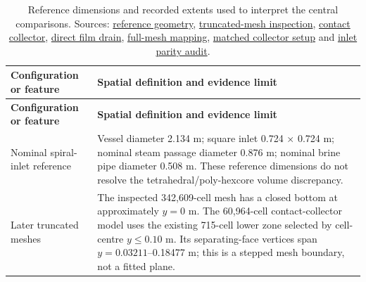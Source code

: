 \begin{longtable}{@{}>{\raggedright\arraybackslash}p{0.29000000\dimexpr\linewidth-2\tabcolsep\relax}>{\raggedright\arraybackslash}p{0.71000000\dimexpr\linewidth-2\tabcolsep\relax}@{}}
\caption{Reference dimensions and recorded extents used to interpret the central comparisons. Sources: \href{https://github.com/Shuhei-uni/P4P_knowledgeWiki/blob/main/Project/technical/purnanto-spiral-inlet-geometry.md}{reference geometry}, \href{https://github.com/Shuhei-uni/P4P_knowledgeWiki/blob/main/Project/experiments/phase-07a-simplified-purnanto-liquid-removal/mesh-inspection.md}{truncated-mesh inspection}, \href{https://github.com/Shuhei-uni/P4P_knowledgeWiki/blob/main/Project/experiments/phase-07-2a-wall-liquid-routing/stage-02-combined-ewf-roughness/ewf-absorber/setup.md}{contact collector}, \href{https://github.com/Shuhei-uni/P4P_knowledgeWiki/blob/main/Project/experiments/phase-07-2a-wall-liquid-routing/stage-04-ewf-wall-parameters/ewf-only-drain/setup.md}{direct film drain}, \href{https://github.com/Shuhei-uni/P4P_knowledgeWiki/blob/main/Project/experiments/phase-07b-full-geometry-liquid-removal/geometry-proof.md}{full-mesh mapping}, \href{https://github.com/Shuhei-uni/P4P_knowledgeWiki/blob/main/Project/experiments/phase-07b-full-geometry-liquid-removal/convergence-investigation/coupled-nphase-weaker-sink/setup.md}{matched collector setup} and \href{https://github.com/Shuhei-uni/P4P_knowledgeWiki/blob/main/Project/experiments/phase-08-storyline-reconstruction/stage-01-60k-storyline/baseline-lineage-audit.md}{inlet parity audit}.}\label{tab:table-D.2}\\
\toprule
\textbf{Configuration or feature} & \textbf{Spatial definition and evidence limit} \\
\midrule
\endfirsthead
\toprule
\textbf{Configuration or feature} & \textbf{Spatial definition and evidence limit} \\
\midrule
\endhead
Nominal spiral-inlet reference & Vessel diameter 2.134 m; square inlet 0.724 × 0.724 m; nominal steam passage diameter 0.876 m; nominal brine pipe diameter 0.508 m. These reference dimensions do not resolve the tetrahedral/poly-hexcore volume discrepancy. \\
Later truncated meshes & The inspected 342,609-cell mesh has a closed bottom at approximately \(y=0\) m. The 60,964-cell contact-collector model uses the existing 715-cell lower zone selected by cell-centre \(y\leq0.10\) m. Its separating-face vertices span \(y=0.03211\)--0.18477 m; this is a stepped mesh boundary, not a fitted plane. \\

\end{longtable}
